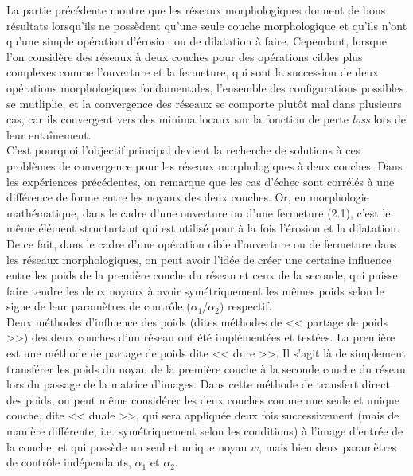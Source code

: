 La partie précédente montre que les réseaux morphologiques 
donnent de bons résultats lorsqu'ils ne possèdent qu'une seule couche morphologique et qu'ils n'ont qu'une simple opération d'érosion ou de dilatation à faire. Cependant, lorsque l'on considère des réseaux à deux couches pour des opérations cibles plus complexes comme l'ouverture et la fermeture, qui sont la succession de deux opérations morphologiques fondamentales, l'ensemble des configurations possibles se mutliplie, et la convergence des réseaux se comporte plutôt mal dans plusieurs cas, car ils convergent vers des minima locaux sur la fonction de perte \textit{loss} lors de leur entaînement. \\

\vspace{-1.6mm}
\noindent C'est pourquoi l'objectif principal devient la recherche de solutions à ces problèmes de convergence pour les réseaux morphologiques à deux couches. 
Dans les expériences précédentes, on remarque que les cas d'échec sont corrélés à une différence de forme entre les noyaux des deux couches. 
Or, en morphologie mathématique, dans le cadre d'une ouverture ou d'une fermeture (2.1), c'est le même élément structurtant qui est utilisé pour à la fois l'érosion et la dilatation. De ce fait, dans le cadre d'une opération cible d'ouverture ou de fermeture dans les réseaux morphologiques, on peut avoir l'idée de créer une certaine influence entre les poids de la première couche du réseau et ceux de la seconde, qui puisse faire tendre les deux noyaux à avoir symétriquement les mêmes poids selon le signe de leur paramètres de contrôle ($\alpha_1/\alpha_2)$ respectif. \\

\vspace{-0.6mm}
Deux méthodes d'influence des poids (dites méthodes de << partage de poids >>) des deux couches d'un réseau ont été implémentées et testées. La première est une méthode de partage de poids dite << dure >>. Il s'agit là de simplement transférer les poids du noyau de la première couche à la seconde couche du réseau lors du passage de la matrice d'images. Dans cette méthode de transfert direct des poids, on peut même considérer les deux couches comme une seule et unique couche, dite << duale >>, qui sera appliquée deux fois successivement (mais de manière différente, i.e. symétriquement selon les conditions) à l'image d'entrée de la couche, et qui possède un seul et unique noyau $w$, mais bien deux paramètres de contrôle indépendants, $\alpha_1$ et $\alpha_2$. \\

